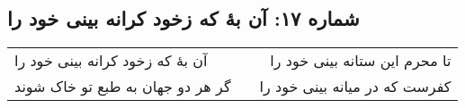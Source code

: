 \begin{center}
\section*{شماره ۱۷: آن بۀ که زخود کرانه بینی خود را}
\label{sec:017}
\begin{longtable}{l p{0.5cm} r}
آن بهٔ که زخود کرانه بینی خود را
&&
تا محرم این ستانه بینی خود را
\\
گر هر دو جهان به طبع تو خاک شوند
&&
کفرست که در میانه بینی خود را
\\
\end{longtable}
\end{center}
